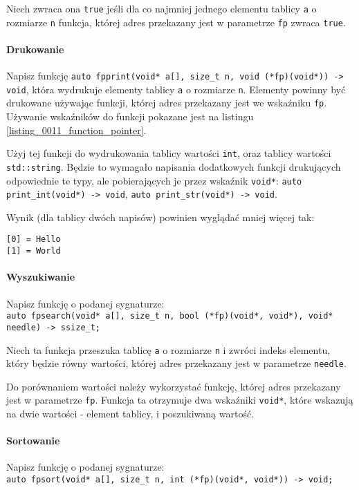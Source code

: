 \documentclass[11pt,a4paper,titlepage,onecolumn]{article}
\begin{document}
Niech zwraca ona \texttt{true} jeśli dla co najmniej jednego elementu tablicy
\texttt{a} o rozmiarze \texttt{n} funkcja, której adres przekazany jest w
parametrze \texttt{fp} zwraca \texttt{true}.

\paragraph{Drukowanie} Napisz funkcję
\texttt{auto fpprint(void* a[], size\_t n, void (*fp)(void*)) -> void}, która
wydrukuje elementy tablicy \texttt{a} o rozmiarze \texttt{n}. Elementy powinny
być drukowane używając funkcji, której adres przekazany jest we wskaźniku
\texttt{fp}. Używanie wskaźników do funkcji pokazane jest na listingu
\ref{listing_0011_function_pointer}.

Użyj tej funkcji do wydrukowania tablicy wartości \texttt{int}, oraz tablicy
wartości \texttt{std::string}. Będzie to wymagało napisania dodatkowych funkcji
drukujących odpowiednie te typy, ale pobierających je przez wskaźnik
\texttt{void*}:
\texttt{auto print\_int(void*) -> void}, \texttt{auto print\_str(void*) ->
void}.

Wynik (dla tablicy dwóch napisów) powinien wyglądać mniej więcej tak:\\
\begin{lstlisting}
[0] = Hello
[1] = World
\end{lstlisting}

\paragraph{Wyszukiwanie} Napisz funkcję o podanej sygnaturze:\\
\texttt{auto fpsearch(void* a[], size\_t n, bool (*fp)(void*, void*), void*
needle) -> ssize\_t;}

Niech ta funkcja przeszuka tablicę \texttt{a} o rozmiarze \texttt{n} i zwróci
indeks elementu, który będzie równy wartości, której adres przekazany jest w
parametrze \texttt{needle}.

Do porównaniem wartości należy wykorzystać funkcję, której adres przekazany jest
w parametrze \texttt{fp}. Funkcja ta otrzymuje dwa wskaźniki \texttt{void*},
które wskazują na dwie wartości - element tablicy, i poszukiwaną wartość.

\paragraph{Sortowanie} Napisz funkcję o podanej sygnaturze:\\
\texttt{auto fpsort(void* a[], size\_t n, int (*fp)(void*, void*)) -> void;}
\end{document}
